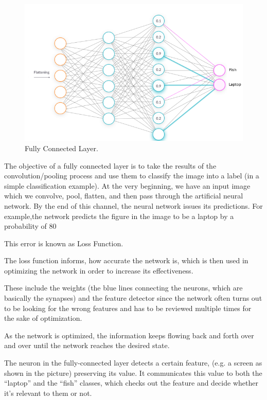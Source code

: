 \documentclass[a4paper,13pt,twoside]{book}
\begin{document}
\begin{figure}[H]
  \includegraphics[width=\linewidth]{Images/fullyconnectedlayer(23).png}
  \caption{Fully Connected Layer.}
  \label{fig:fully connected layer}
\end{figure}

The objective of a fully connected layer is to take the results of the convolution/pooling process and use them to classify the image into a label (in a simple classification example).
At the very beginning, we have an input image which we convolve, pool, flatten, and then pass through the artificial neural network.
By the end of this channel, the neural network issues its predictions. For example,the network predicts the figure in the image to be a laptop by a probability of 80%

This error is known as Loss Function.

The loss function informs, how accurate the network is, which is then used in optimizing the network in order to increase its effectiveness.

These include the weights (the blue lines connecting the neurons, which are basically the synapses) and the feature detector since the network often turns out to be looking for the wrong features and has to be reviewed multiple times for the sake of optimization.

As the network is optimized, the information keeps flowing back and forth over and over until the network reaches the desired state.

The neuron in the fully-connected layer detects a certain feature, (e.g. a screen as shown in the picture) preserving its value.
It communicates this value to both the “laptop” and the “fish” classes, which checks out the feature and decide whether it's relevant to them or not.
\end{document}
